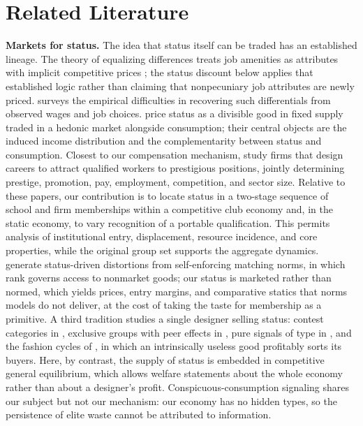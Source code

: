 \documentclass[12pt,letterpaper]{article}
\theoremstyle{definition}
\begin{document}
\section{Related Literature}\label{sec:lit}

\textbf{Markets for status.}
The idea that status itself can be traded has an established lineage.
The theory of equalizing differences treats job amenities as attributes with implicit competitive prices \citep{rosen1974hedonic,rosen1986equalizing}; the status discount below applies that established logic rather than claiming that nonpecuniary job attributes are newly priced.
\citet{lavetti2023compensating} surveys the empirical difficulties in recovering such differentials from observed wages and job choices.
\citet{beckermurphywerning2005} price status as a divisible good in fixed supply traded in a hedonic market alongside consumption; their central objects are the induced income distribution and the complementarity between status and consumption.
Closest to our compensation mechanism, \citet{ferreiranikolowa2024} study firms that design careers to attract qualified workers to prestigious positions, jointly determining prestige, promotion, pay, employment, competition, and sector size.
Relative to these papers, our contribution is to locate status in a two-stage sequence of school and firm memberships within a competitive club economy and, in the static economy, to vary recognition of a portable qualification.
This permits analysis of institutional entry, displacement, resource incidence, and core properties, while the original group set supports the aggregate dynamics.
\citet{colemailathpostlewaite1992} generate status-driven distortions from self-enforcing matching norms, in which rank governs access to nonmarket goods; our status is marketed rather than normed, which yields prices, entry margins, and comparative statics that norms models do not deliver, at the cost of taking the taste for membership as a primitive.
A third tradition studies a single designer selling status: contest categories in \citet{moldovanuselashi2007}, exclusive groups with peer effects in \citet{board2009group}, pure signals of type in \citet{rayo2013signal}, and the fashion cycles of \citet{pesendorfer1995fashion}, in which an intrinsically useless good profitably sorts its buyers.
Here, by contrast, the supply of status is embedded in competitive general equilibrium, which allows welfare statements about the whole economy rather than about a designer's profit.
Conspicuous-consumption signaling \citep{bagwellbernheim1996veblen} shares our subject but not our mechanism: our economy has no hidden types, so the persistence of elite waste cannot be attributed to information.
\end{document}
